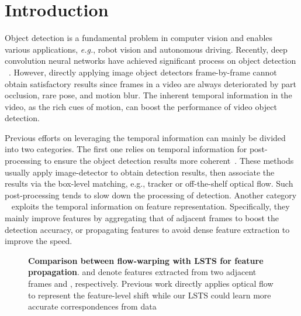 \documentclass[runningheads]{llncs}
\begin{document}
\section{Introduction}

Object detection is a fundamental problem in computer vision and enables various applications, {\em e.g.}, robot vision and autonomous driving. Recently, deep convolution neural networks have achieved significant process on object detection ~\cite{girshick2014rich,ren2015faster,liu2016ssd,lin2017feature,he2017mask}. However, directly applying image object detectors frame-by-frame cannot obtain satisfactory results since frames in a video are always deteriorated by part occlusion, rare pose, and motion blur. The inherent temporal information in the video, as the rich cues of motion, can boost the performance of video object detection. 

Previous efforts on leveraging the temporal information can mainly be divided into two categories. The first one  relies on temporal information for post-processing to ensure the object detection results more coherent~\cite{kang2016object,kang2017object,han2016seq}. These methods usually apply image-detector to obtain detection results, then associate the results via the box-level matching, e.g., tracker or off-the-shelf optical flow. Such post-processing tends to slow down the processing of detection. Another category ~\cite{wang2018fully,zhu2018towards,zhu2017deep,zhu2017flow,hetang2017impression,Jiang2019VideoOD,wu2019sequence,shvets2019leveraging,jiang2019learning} exploits the temporal information on feature representation. Specifically, they mainly improve features by aggregating that of adjacent frames to boost the detection accuracy, or propagating features to avoid dense feature extraction to improve the speed.

\begin{figure}[t]
\centering
{}\caption{
\textbf{Comparison between flow-warping with LSTS for feature propagation}.
 and  denote features extracted from two adjacent frames  and , respectively. Previous work directly applies optical flow to represent the feature-level shift while our LSTS could learn more accurate correspondences from data
}
\label{flow-warping-lsts}
\end{figure}
\end{document}
